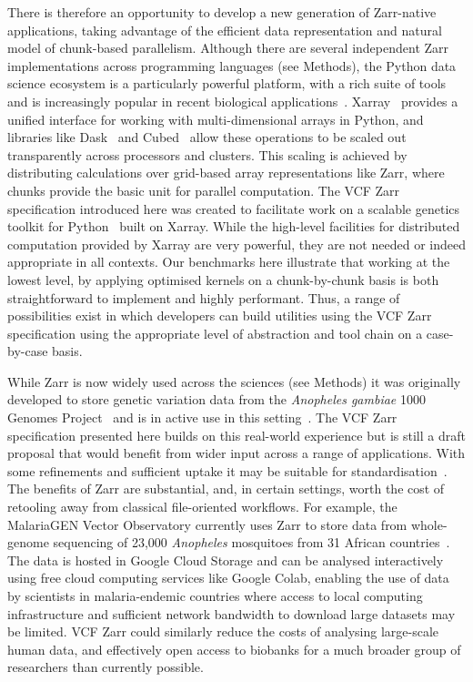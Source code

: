 \documentclass[a4paper,num-refs]{oup-contemporary}
\begin{document}
There is therefore an opportunity to develop a new 
generation of Zarr-native applications, taking advantage of the efficient data
representation and natural model of chunk-based parallelism.
Although there are several independent Zarr implementations
across programming languages (see Methods),
the Python data science ecosystem is a particularly powerful
platform,
with a rich suite of tools~\cite[e.g.][]{
mckinney2010data,
scikit-learn, 
lam2015numba,
kluyver2016jupyter,
harris2020array,
virtanen2020scipy}
and is increasingly
popular in recent biological applications~\citep[e.g.][]{
abdennur2020cooler,
rand2022bionumpy,
open2c2024bioframe,
hou2024admix}.
Xarray~\cite{hoyer2017xarray} provides a unified interface for working
with multi-dimensional arrays
in Python, and libraries like Dask~\cite{rocklin2015dask}
and Cubed~\cite{cubed2024} allow these operations to be
scaled out transparently across processors and clusters.
This scaling is achieved by distributing calculations over
grid-based array representations like Zarr, where chunks
provide the basic unit for parallel computation.
The VCF Zarr specification introduced here was created
to facilitate work on a scalable genetics toolkit for
Python~\cite{sgkit2024} built on Xarray.
While the high-level facilities for distributed
computation provided by Xarray
are very powerful, they are not needed or indeed
appropriate in all contexts. Our benchmarks here
illustrate that working at the lowest level,
by applying optimised kernels on a chunk-by-chunk
basis is both straightforward to implement and highly performant.
Thus, a range of possibilities exist in which developers
can build utilities using the VCF Zarr specification
using the appropriate level of abstraction and tool chain
on a case-by-case basis.

While Zarr is now widely used across the sciences (see Methods)
it was originally
developed to store genetic variation data from the
\textit{Anopheles gambiae}
1000 Genomes Project~\citep{anopheles2017genetic}
and is in active use in this
setting~\cite[e.g.][]{ahouidi2021open,trimarsanto2022molecular}.
The VCF Zarr specification presented here builds on this real-world
experience but is still a draft proposal that would benefit
from wider input across a range of applications. With some
refinements and sufficient uptake it may be suitable
for standardisation~\cite{rehm2021ga4gh}.
The benefits of Zarr are substantial, and, in certain settings,
worth the cost of retooling away from classical file-oriented workflows.
For example, the MalariaGEN Vector Observatory
currently uses Zarr to store data from whole-genome sequencing
of 23,000 \textit{Anopheles} mosquitoes from 31 African
countries~\cite{mvgo2024}.
The data is hosted in Google Cloud Storage and can be analysed interactively
using free cloud computing services like Google Colab,
enabling the use of data by scientists in malaria-endemic countries
where access to local computing infrastructure and sufficient network
bandwidth to download large datasets may be limited.
VCF Zarr could similarly reduce the costs of analysing large-scale
human data, and effectively open access to biobanks
for a much broader group of researchers than currently possible.
\end{document}
